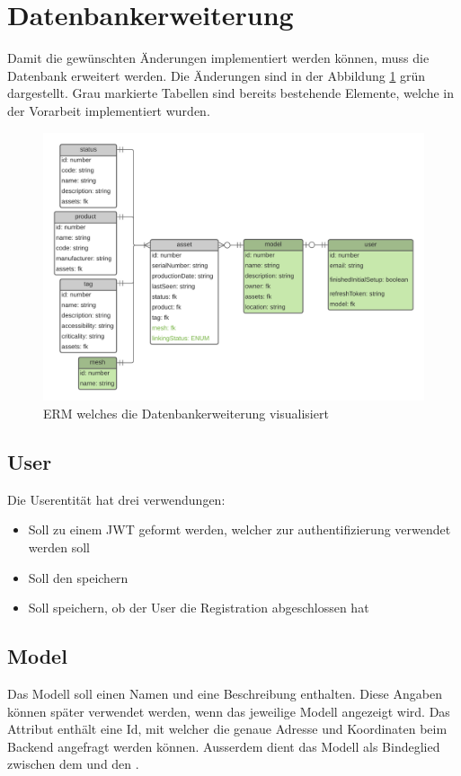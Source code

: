 \section{Datenbankerweiterung}
Damit die gewünschten Änderungen implementiert werden können, muss die Datenbank erweitert werden. Die Änderungen sind in der Abbildung \ref{fig:db-erweiterung} grün dargestellt. Grau markierte Tabellen sind bereits bestehende Elemente, welche in der Vorarbeit implementiert wurden.
\begin{figure}[H]
  \centering
  \includegraphics[width=.95\linewidth]{./images/ERM-OSE.png}
  \caption[{ERM welches die Datenbankerweiterung visualisiert}]{ERM welches die Datenbankerweiterung visualisiert}
  \label{fig:db-erweiterung}
\end{figure}
\subsection{User}
Die Userentität hat drei verwendungen:
\begin{itemize}
  \item Soll zu einem JWT geformt werden, welcher zur authentifizierung verwendet werden soll
  \item Soll den  speichern
  \item Soll speichern, ob der User die Registration abgeschlossen hat
\end{itemize}
\subsection{Model}
Das Modell soll einen Namen und eine Beschreibung enthalten. Diese Angaben können später verwendet werden, wenn das jeweilige Modell angezeigt wird. Das Attribut  enthält eine Id, mit welcher die genaue Adresse und Koordinaten beim Backend angefragt werden können. Ausserdem dient das Modell als Bindeglied zwischen dem  und den .

